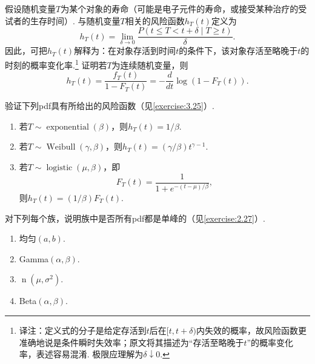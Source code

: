 \begin{exercise}\label{exercise:3.25}
假设随机变量$T$为某个对象的寿命（可能是电子元件的寿命，或接受某种治疗的受试者的生存时间）. 与随机变量$T$相关的风险函数$h_T(t)$定义为
$$h_T(t)=\lim_{\delta\to0}\frac{P(t\le T<t+\delta\mid T\ge t)}\delta.$$
因此，可把$h_T(t)$解释为：在对象存活到时间$t$的条件下，该对象存活至略晚于$t$的时刻的概率变化率.\footnote{译注：定义式的分子是给定存活到$t$后在$[t,t+\delta)$内失效的概率，故风险函数更准确地说是条件瞬时失效率；原文将其描述为“存活至略晚于$t$”的概率变化率，表述容易混淆. 极限应理解为$\delta\downarrow0$.} 证明若$T$为连续随机变量，则
$$h_T(t)=\frac{f_T(t)}{1-F_T(t)}=-\frac d{dt}\log(1-F_T(t)).$$
\end{exercise}
\begin{exercise}\label{exercise:3.26}
验证下列pdf具有所给出的风险函数（见\autoref{exercise:3.25}）.
\begin{enumerate}
\item[(a)] 若$T\sim\operatorname{exponential}(\beta)$，则$h_T(t)=1/\beta$.
\item[(b)] 若$T\sim\operatorname{Weibull}(\gamma,\beta)$，则$h_T(t)=(\gamma/\beta)t^{\gamma-1}$.
\item[(c)] 若$T\sim\operatorname{logistic}(\mu,\beta)$，即
$$F_T(t)=\frac1{1+e^{-(t-\mu)/\beta}},$$
则$h_T(t)=(1/\beta)F_T(t)$.
\end{enumerate}
\end{exercise}
\begin{exercise}\label{exercise:3.27}
对下列每个族，说明族中是否所有pdf都是单峰的（见\autoref{exercise:2.27}）.
\begin{enumerate}
\item[(a)] 均匀$(a,b)$.
\item[(b)] Gamma$(\alpha,\beta)$.
\item[(c)] $\operatorname n(\mu,\sigma^2)$.
\item[(d)] Beta$(\alpha,\beta)$.
\end{enumerate}
\end{exercise}

